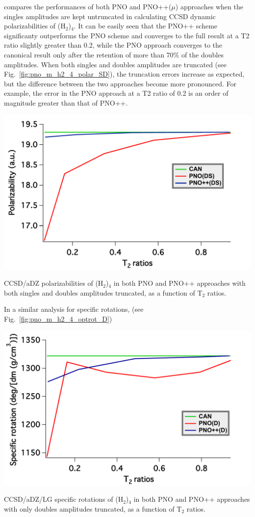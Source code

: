 compares the performances of both PNO and PNO++($\mu$) approaches when the singles
amplitudes are kept untruncated in calculating CCSD dynamic polarizabilities 
of (H$_2$)$_4$. It can be easily seen that the PNO++ scheme significanty outperforms 
the PNO scheme and converges to the full result at a T2 ratio slightly greater 
than 0.2, while the PNO approach converges to the canonical result only after the retention
of more than 70\% of the doubles amplitudes. When both singles and doubles amplitudes
are truncated (see Fig.~\ref{fig:pno_m_h2_4_polar_SD}), the truncation errors increase
as expected, but the difference between the two approaches become more pronounced.
For example, the error in the PNO approach at a T2 ratio of 0.2 is an order of
magnitude greater than that of PNO++. 
\begin{MyFigure}[h!]
\centering
\includegraphics[width=0.6\linewidth,natwidth=610,natheight=642]{figures_pno++/h2_4_polar_DS.pdf}
\caption{{\footnotesize CCSD/aDZ polarizabilities of (H$_2$)$_4$ in both PNO and PNO++ approaches
with both singles and doubles amplitudes truncated, as a function of T$_2$ ratios.}}
\label{fig:pno_m_h2_4_polar_SD}
\end{MyFigure}
In a similar analysis for specific rotations, (see Fig.~\ref{fig:pno_m_h2_4_optrot_D})
\begin{MyFigure}[h!]
\centering
\includegraphics[width=0.6\linewidth,natwidth=610,natheight=642]{figures_pno++/h2_4_optrot_lg_D.pdf}
\caption{{\footnotesize CCSD/aDZ/LG specific rotations of (H$_2$)$_4$ in both PNO and PNO++ approaches
with only doubles amplitudes truncated, as a function of T$_2$ ratios.}}
\label{fig:pno_m_h2_4_optrot_D}
\end{MyFigure}
